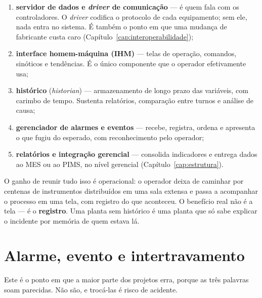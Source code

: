 \begin{enumerate}
  \item \textbf{servidor de dados e \emph{driver} de comunicação} --- é quem fala com os
        controladores. O \emph{driver} codifica o protocolo de cada equipamento; sem ele, nada entra
        no sistema. É também o ponto em que uma mudança de fabricante custa caro
        (Capítulo~\ref{cap:interoperabilidade});
  \item \textbf{interface homem-máquina (IHM)} --- telas de operação, comandos, sinóticos e
        tendências. É o único componente que o operador efetivamente usa;
  \item \textbf{histórico} (\emph{historian}) --- armazenamento de longo prazo das variáveis, com
        carimbo de tempo. Sustenta relatórios, comparação entre turnos e análise de causa;
  \item \textbf{gerenciador de alarmes e eventos} --- recebe, registra, ordena e apresenta o que fugiu
        do esperado, com reconhecimento pelo operador;
  \item \textbf{relatórios e integração gerencial} --- consolida indicadores e entrega dados ao MES ou
        ao PIMS, no nível gerencial (Capítulo~\ref{cap:estrutura}).
\end{enumerate}

O ganho de reunir tudo isso é operacional: o operador deixa de caminhar por centenas de instrumentos
distribuídos em uma sala extensa e passa a acompanhar o processo em uma tela, com registro do que
aconteceu. O benefício real não é a tela --- é o \textbf{registro}. Uma planta sem histórico é uma
planta que só sabe explicar o incidente por memória de quem estava lá.

\section{Alarme, evento e intertravamento}

Este é o ponto em que a maior parte dos projetos erra, porque as três palavras soam parecidas.
Não são, e trocá-las é risco de acidente.

